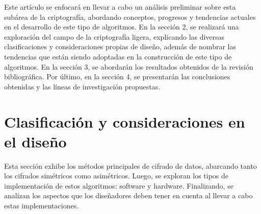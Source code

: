 \documentclass[a4paper,10pt]{article}
\begin{document}
	Este artículo se enfocará en llevar a cabo un análisis preliminar sobre esta subárea de la criptografía, abordando conceptos, progresos y tendencias actuales en el desarrollo de este tipo de algoritmos. En la sección 2, se realizará una exploración del campo de la criptografía ligera, explicando las diversas clasificaciones y consideraciones propias de diseño, además de nombrar las tendencias que están siendo adoptadas en la construcción de este tipo de algoritmos. En la sección 3, se abordarán los resultados obtenidos de la revisión bibliográfica. Por último, en la sección 4, se presentarán las conclusiones obtenidas y las líneas de investigación propuestas.
	
	\section{Clasificación y consideraciones en el diseño}
	\label{seccion2}
	Esta sección exhibe los métodos principales de cifrado de datos, abarcando tanto los cifrados simétricos como asimétricos. Luego, se exploran los tipos de implementación de estos algoritmos: software y hardware. Finalizando, se analizan los aspectos que los diseñadores deben tener en cuenta al llevar a cabo estas implementaciones.
	
\end{document}
